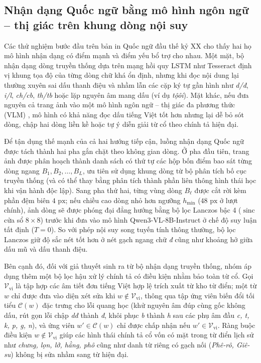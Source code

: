 \subsection{Nhận dạng Quốc ngữ bằng mô hình ngôn ngữ -- thị giác trên khung dòng nội suy}

Các thử nghiệm bước đầu trên bản in Quốc ngữ đầu thế kỷ XX cho thấy hai họ mô hình nhận dạng có điểm mạnh và điểm yếu bổ trợ cho nhau. Một mặt, bộ nhận dạng dòng truyền thống dựa trên mạng hồi quy LSTM như Tesseract định vị khung tọa độ của từng dòng chữ khá ổn định, nhưng khi đọc nội dung lại thường xuyên sai dấu thanh điệu và nhầm lẫn các cặp ký tự gần hình như \textit{d/đ}, \textit{i/l}, \textit{ch/cb}, \textit{th/tb} hoặc lặp nguyên âm mang dấu (ví dụ \textit{tộôi}). Mặt khác, nếu đưa nguyên cả trang ảnh vào một mô hình ngôn ngữ -- thị giác đa phương thức (VLM) \cite{bai2025qwenvl}, mô hình có khả năng đọc dấu tiếng Việt tốt hơn nhưng lại dễ bỏ sót dòng, chập hai dòng liền kề hoặc tự ý diễn giải từ cổ theo chính tả hiện đại.

Để tận dụng thế mạnh của cả hai hướng tiếp cận, luồng nhận dạng Quốc ngữ được tách thành hai pha gắn chặt theo không gian dòng. Ở pha đầu tiên, trang ảnh được phân hoạch thành danh sách có thứ tự các hộp bốn điểm bao sát từng dòng ngang $B_1, B_2, \dots, B_L$, ưu tiên sử dụng khung dòng từ bộ phân tích bố cục truyền thống (và có thể thay bằng phân tích thành phần liên thông hình thái học khi vận hành độc lập). Sang pha thứ hai, từng vùng dòng $B_\ell$ được cắt rời kèm phần đệm biên $4\text{ px}$; nếu chiều cao dòng nhỏ hơn ngưỡng $h_{\min}$ ($48\text{ px}$ ở lượt chính), ảnh dòng sẽ được phóng đại đẳng hướng bằng bộ lọc Lanczos bậc 4 ($\operatorname{sinc}$ cửa sổ $8 \times 8$) trước khi đưa vào mô hình Qwen3-VL-8B-Instruct ở chế độ suy luận tất định ($T = 0$). So với phép nội suy song tuyến tính thông thường, bộ lọc Lanczos giữ độ sắc nét tốt hơn ở nét gạch ngang chữ \textit{đ} cũng như khoảng hở giữa dấu mũ và dấu thanh điệu.

Bên cạnh đó, đối với giả thuyết sinh ra từ bộ nhận dạng truyền thống, nhóm áp dụng thêm một bộ lọc hậu xử lý chính tả có điều kiện nhằm bảo toàn từ cổ. Gọi $\mathcal{V}_{\text{vi}}$ là tập hợp các âm tiết đơn tiếng Việt hợp lệ trích xuất từ kho từ điển; một từ $w$ chỉ được đưa vào diện xét sửa khi $w \notin \mathcal{V}_{\text{vi}}$, thông qua tập ứng viên biến đổi tối tiểu $\mathcal{C}(w)$ đặc trưng cho lỗi quang học (khử nguyên âm đúp cùng gốc không dấu, rút gọn lỗi chập \textit{dđ} thành \textit{đ}, khôi phục \textit{b} thành \textit{h} sau các phụ âm đầu \textit{c, t, k, p, g, n}), và ứng viên $w' \in \mathcal{C}(w)$ chỉ được chấp nhận nếu $w' \in \mathcal{V}_{\text{vi}}$. Ràng buộc điều kiện $w \notin \mathcal{V}_{\text{vi}}$ giúp các hình thái chính tả cổ vốn có mặt trong từ điển lịch sử như \textit{chưng, lọn, lở, hằng, phô} cũng như danh từ riêng có gạch nối (\textit{Phê-rô, Giê-su}) không bị sửa nhầm sang từ hiện đại.

